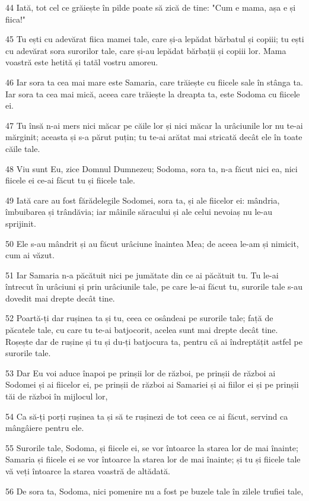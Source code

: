 \par 44 Iată, tot cel ce grăiește în pilde poate să zică de tine: "Cum e mama, așa e și fiica!"
\par 45 Tu ești cu adevărat fiica mamei tale, care și-a lepădat bărbatul și copiii; tu ești cu adevărat sora surorilor tale, care și-au lepădat bărbații și copiii lor. Mama voastră este hetită și tatăl vostru amoreu.
\par 46 Iar sora ta cea mai mare este Samaria, care trăiește cu fiicele sale în stânga ta. Iar sora ta cea mai mică, aceea care trăiește la dreapta ta, este Sodoma cu fiicele ei.
\par 47 Tu însă n-ai mers nici măcar pe căile lor și nici măcar la urâciunile lor nu te-ai mărginit; aceasta și s-a părut puțin; tu te-ai arătat mai stricată decât ele în toate căile tale.
\par 48 Viu sunt Eu, zice Domnul Dumnezeu; Sodoma, sora ta, n-a făcut nici ea, nici fiicele ei ce-ai făcut tu și fiicele tale.
\par 49 Iată care au fost fărădelegile Sodomei, sora ta, și ale fiicelor ei: mândria, îmbuibarea și trândăvia; iar mâinile săracului și ale celui nevoiaș nu le-au sprijinit.
\par 50 Ele s-au mândrit și au făcut urâciune înaintea Mea; de aceea le-am și nimicit, cum ai văzut.
\par 51 Iar Samaria n-a păcătuit nici pe jumătate din ce ai păcătuit tu. Tu le-ai întrecut în urâciuni și prin urâciunile tale, pe care le-ai făcut tu, surorile tale s-au dovedit mai drepte decât tine.
\par 52 Poartă-ți dar rușinea ta și tu, ceea ce osândeai pe surorile tale; față de păcatele tale, cu care tu te-ai batjocorit, acelea sunt mai drepte decât tine. Roșește dar de rușine și tu și du-ți batjocura ta, pentru că ai îndreptățit astfel pe surorile tale.
\par 53 Dar Eu voi aduce înapoi pe prinșii lor de război, pe prinșii de război ai Sodomei și ai fiicelor ei, pe prinșii de război ai Samariei și ai fiilor ei și pe prinșii tăi de război în mijlocul lor,
\par 54 Ca să-ți porți rușinea ta și să te rușinezi de tot ceea ce ai făcut, servind ca mângâiere pentru ele.
\par 55 Surorile tale, Sodoma, și fiicele ei, se vor întoarce la starea lor de mai înainte; Samaria și fiicele ei se vor întoarce la starea lor de mai înainte; și tu și fiicele tale vă veți întoarce la starea voastră de altădată.
\par 56 De sora ta, Sodoma, nici pomenire nu a fost pe buzele tale în zilele trufiei tale,

